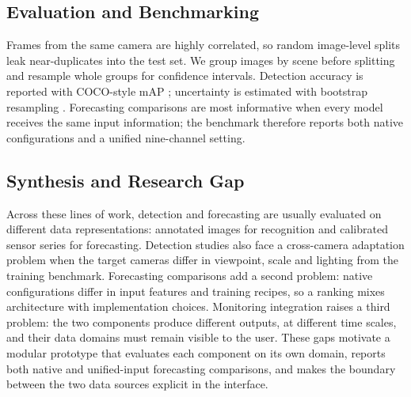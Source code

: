 \subsection{Evaluation and Benchmarking}\label{sec:literature-evaluation}

Frames from the same camera are highly correlated, so random image-level splits
leak near-duplicates into the test set. We group images by scene before
splitting and resample whole groups for confidence intervals. Detection accuracy
is reported with COCO-style mAP \parencite{lin2014coco}; uncertainty is estimated
with bootstrap resampling \parencite{efron1993bootstrap}. Forecasting comparisons
are most informative when every model receives the same input information; the
benchmark therefore reports both native configurations and a unified
nine-channel setting.

\subsection{Synthesis and Research Gap}\label{sec:literature-gap}

Across these lines of work, detection and forecasting are usually evaluated on
different data representations: annotated images for recognition and calibrated
sensor series for forecasting. Detection studies also face a cross-camera
adaptation problem when the target cameras differ in viewpoint, scale and
lighting from the training benchmark. Forecasting comparisons add a second
problem: native configurations differ in input features and training recipes, so
a ranking mixes architecture with implementation choices. Monitoring
integration raises a third problem: the two components produce different
outputs, at different time scales, and their data domains must remain visible to
the user. These gaps motivate a modular prototype that evaluates each component
on its own domain, reports both native and unified-input forecasting
comparisons, and makes the boundary between the two data sources explicit in
the interface.
